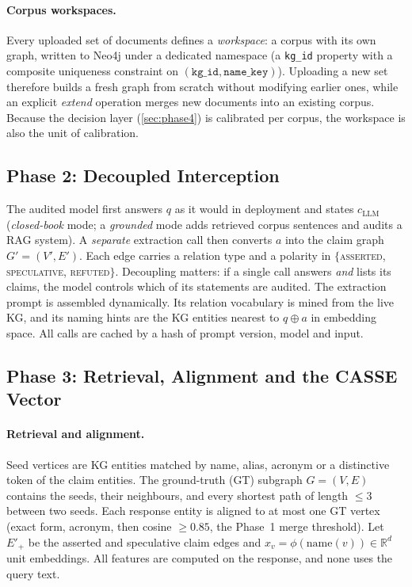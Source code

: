 \documentclass[10pt,twocolumn]{article}
\theoremstyle{remark}
\newcommand{\R}{\mathbb{R}}
\begin{document}
\paragraph{Corpus workspaces.}
Every uploaded set of documents defines a \emph{workspace}: a corpus with its own graph, written to Neo4j under a
dedicated namespace (a \texttt{kg\_id} property with a composite uniqueness constraint on
$(\texttt{kg\_id},\texttt{name\_key})$). Uploading a new set therefore builds a fresh graph from scratch without
modifying earlier ones, while an explicit \emph{extend} operation merges new documents into an existing corpus.
Because the decision layer (\cref{sec:phase4}) is calibrated per corpus, the workspace is also the unit of
calibration.

\subsection{Phase 2: Decoupled Interception}
\label{sec:phase2}

The audited model first answers $q$ as it would in deployment and states $c_{\mathrm{LLM}}$ (\emph{closed-book}
mode; a \emph{grounded} mode adds retrieved corpus sentences and audits a RAG system). A \emph{separate} extraction
call then converts $a$ into the claim graph $G'=(V',E')$. Each edge carries a relation type and a polarity in
$\{$\textsc{asserted}, \textsc{speculative}, \textsc{refuted}$\}$. Decoupling matters: if a single call answers
\emph{and} lists its claims, the model controls which of its statements are audited. The extraction prompt is
assembled dynamically. Its relation vocabulary is mined from the live KG, and its naming hints are the KG entities
nearest to $q\oplus a$ in embedding space. All calls are cached by a hash of prompt version, model and input.

\subsection{Phase 3: Retrieval, Alignment and the CASSE Vector}
\label{sec:phase3}

\paragraph{Retrieval and alignment.}
Seed vertices are KG entities matched by name, alias, acronym or a distinctive token of the claim entities. The
ground-truth (GT) subgraph $G=(V,E)$ contains the seeds, their neighbours, and every shortest path of length $\le3$
between two seeds. Each response entity is aligned to at most one GT vertex (exact form, acronym, then cosine $\ge0.85$,
the Phase~1 merge threshold). Let $E'_{+}$ be the asserted and speculative claim edges and
$x_v=\phi(\mathrm{name}(v))\in\R^{d}$ unit embeddings. All features are computed on the response, and none uses the
query text.
\end{document}
